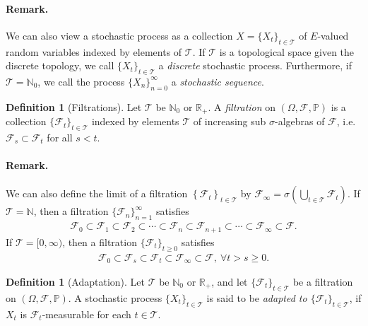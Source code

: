 \documentclass{article}
\numberwithin{equation}{section}
\renewcommand{\P}{\mathbb{P}}
\theoremstyle{plain}
\theoremstyle{definition}
\newtheorem{definition}[theorem]{Definition}
\begin{document}
\paragraph{Remark.} We can also view a stochastic process as a collection $X=\{X_t\}_{t\in\mathcal{T}}$ of $E$-valued random variables indexed by elements of $\mathcal{T}$. If $\mathcal{T}$ is a topological space given the discrete topology, we call $\{X_t\}_{t\in\mathcal{T}}$ a \textit{discrete} stochastic process. Furthermore, if $\mathcal{T}=\mathbb{N}_0$, we call the process $\{X_n\}_{n=0}^\infty$ a \textit{stochastic sequence}.

\begin{definition}[Filtrations]\label{def:3.2} Let $\mathcal{T}$ be $\mathbb{N}_0$ or $\mathbb{R}_+$. A \textit{filtration} on $(\Omega,\mathscr{F},\P)$ is a collection $\{\mathscr{F}_t\}_{t\in\mathcal{T}}$ indexed by elements $\mathcal{T}$ of increasing sub $\sigma$-algebras of $\mathscr{F}$, i.e. $\mathscr{F}_s\subset\mathscr{F}_t$ for all $s<t$.
\paragraph{Remark.} We can also define the limit of a filtration $\left\{\mathscr{F}_t\right\}_{t\in\mathcal{T}}$ by $\mathscr{F}_\infty=\sigma\left(\bigcup_{t\in\mathcal{T}}\mathscr{F}_t\right)$. If $\mathcal{T}=\mathbb{N}$, then a filtration $\{\mathscr{F}_n\}_{n=1}^\infty$ satisfies
\begin{align*}
	\mathscr{F}_0\subset\mathscr{F}_1\subset\mathscr{F}_2\subset\cdots\subset\mathscr{F}_n\subset\mathscr{F}_{n+1}\subset\cdots\subset\mathscr{F}_\infty\subset\mathscr{F}.
\end{align*}
If $\mathcal{T}=[0,\infty)$, then a filtration $\{\mathscr{F}_t\}_{t\geq 0}$ satisfies
\begin{align*}
	\mathscr{F}_0\subset\mathscr{F}_s\subset\mathscr{F}_t\subset\mathscr{F}_\infty\subset\mathscr{F},\ \forall t>s\geq 0.
\end{align*}
\end{definition}
\begin{definition}[Adaptation]\label{def:3.3} Let $\mathcal{T}$ be $\mathbb{N}_0$ or $\mathbb{R}_+$, and let $\{\mathscr{F}_t\}_{t\in\mathcal{T}}$ be a filtration on $(\Omega,\mathscr{F},\P)$. A stochastic process $\{X_t\}_{t\in\mathcal{T}}$ is said to be \textit{adapted to $\{\mathscr{F}_t\}_{t\in\mathcal{T}}$}, if $X_t$ is $\mathscr{F}_t$-measurable for each $t\in\mathcal{T}$.
\end{definition}
\end{document}
